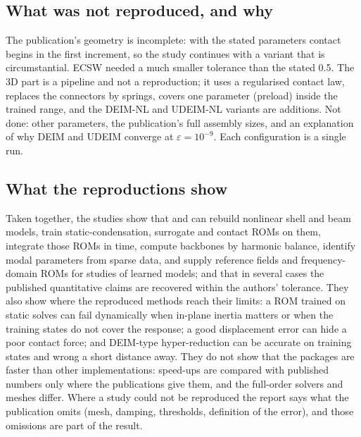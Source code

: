 \subsection*{What was not reproduced, and why}

The publication's geometry is incomplete: with the stated parameters contact begins in the first increment, so the study continues with a variant that is circumstantial. ECSW needed a much smaller tolerance than the stated 0.5. The 3D part is a pipeline and not a reproduction; it uses a regularised contact law, replaces the connectors by springs, covers one parameter (preload) inside the trained range, and the DEIM-NL and UDEIM-NL variants are additions. Not done: other parameters, the publication's full assembly sizes, and an explanation of why DEIM and UDEIM converge at $\varepsilon=10^{-9}$. Each configuration is a single run.

\subsection*{What the reproductions show}\label{sec:vf-repro-summary}

Taken together, the studies show that \fea{} and \rom{} can rebuild nonlinear shell and beam models, train static-condensation, surrogate and contact ROMs on them, integrate those ROMs in time, compute backbones by harmonic balance, identify modal parameters from sparse data, and supply reference fields and frequency-domain ROMs for studies of learned models; and that in several cases the published quantitative claims are recovered within the authors' tolerance. They also show where the reproduced methods reach their limits: a ROM trained on static solves can fail dynamically when in-plane inertia matters or when the training states do not cover the response; a good displacement error can hide a poor contact force; and DEIM-type hyper-reduction can be accurate on training states and wrong a short distance away. They do not show that the packages are faster than other implementations: speed-ups are compared with published numbers only where the publications give them, and the full-order solvers and meshes differ. Where a study could not be reproduced the report says what the publication omits (mesh, damping, thresholds, definition of the error), and those omissions are part of the result.

